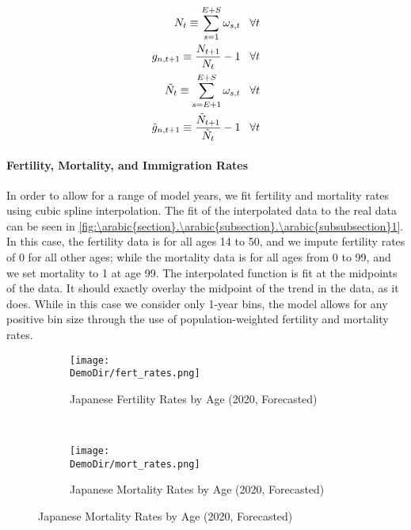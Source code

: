 \documentclass[10pt]{article}
\renewcommand{\thesection}{\arabic{section}}
\renewcommand{\thesubsection}{\thesection.\arabic{subsection}}
\renewcommand{\thesubsubsection}{\thesubsection.\arabic{subsubsection}}
\numberwithin{equation}{subsection}
\newcommand*{\DemoDir}{../../code/Rick/OUTPUT/Demographics}
\begin{document}
\begin{appendices}
\begin{align}
   N_t \equiv \sum_{s=1}^{E+S}\omega_{s,t} \hspace{3mm} \forall t \\
   g_{n,t+1} \equiv \frac{N_{t+1}}{N_t} - 1 \hspace{3mm} \forall t \\
   \tilde{N}_t \equiv \sum_{s=E+1}^{E+S}\omega_{s,t} \hspace{3mm} \forall t \\
   \tilde{g}_{n,t+1} \equiv \frac{\tilde{N}_{t+1}}{\tilde{N}_t} - 1 \hspace{3mm} \forall t
\end{align}


\paragraph{Fertility, Mortality, and Immigration Rates}

In order to allow for a range of model years, we fit fertility and mortality rates using cubic spline interpolation. The fit of the interpolated data to the real data can be seen in \autoref{fig:\thesubsubsection1}. In this case, the fertility data is for all ages 14 to 50, and we impute fertility rates of 0 for all other ages; while the mortality data is for all ages from 0 to 99, and we set mortality to 1 at age 99. The interpolated function is fit at the midpoints of the data. It should exactly overlay the midpoint of the trend in the data, as it does. While in this case we consider only 1-year bins, the model allows for any positive bin size through the use of population-weighted fertility and mortality rates.

\begin{figure}[H]
   \caption{\label{fig:\thesubsubsection1}Fertility and Mortality Rates by Age}
   \begin{subfigure}{0.5\textwidth}
      \centering
      \texttt{[image: \\DemoDir/fert\_rates.png]}
      \caption{Japanese Fertility Rates by Age (2020, Forecasted)}
   \end{subfigure}%
   ~ %
   \begin{subfigure}{0.5\textwidth}
      \centering
      \texttt{[image: \\DemoDir/mort\_rates.png]}
      \caption{Japanese Mortality Rates by Age (2020, Forecasted)}
   \end{subfigure}
\end{figure}


\end{appendices}
\end{document}
